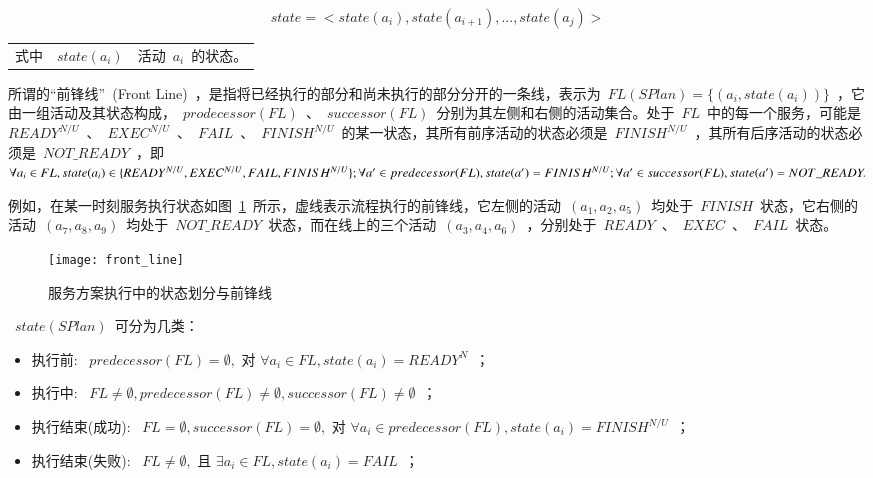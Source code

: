 \begin{equation}\label{equation:state_total}
state = < state(a_i),state(a_{i+1}),..., state(a_j)>
\end{equation}
\begin{tabularx}{\textwidth}{@{}l@{\quad}l@{\pozhehao }X@{}}
    式中
    & $state(a_i)$ & 活动~$a_i$~的状态。
\end{tabularx}\vspace{\wordsep}

所谓的“前锋线”~(Front Line)~，是指将已经执行的部分和尚未执行的部分分开的一条线，表示为~$FL(SPlan)=\{(a_i, state(a_i))\}$~，它由一组活动及其状态构成，~$prodecessor(FL)$~、~$successor(FL)$~分别为其左侧和右侧的活动集合。处于~$FL$~中的每一个服务，可能是~$READY^{N/U}$~、~$EXEC^{N/U}$~、~$FAIL$~、~$FINISH^{N/U}$~的某一状态，其所有前序活动的状态必须是~$FINISH^{N/U}$~，其所有后序活动的状态必须是~$NOT\_READY$~，即
$\forall {a_i} \in FL,state({a_i}) \in \{ READ{Y^{N/U}},{\rm{ }}EXE{C^{N/U}},{\rm{ }}FAIL,{\rm{ }}FINIS{H^{N/U}}\} ;\forall a' \in predecessor(FL),state(a') = FINIS{H^{N/U}};\forall a' \in successor(FL),state(a') = NOT\_READY.$

例如，在某一时刻服务执行状态如图~\ref{figure:front_line}~所示，虚线表示流程执行的前锋线，它左侧的活动~$(a_1, a_2, a_5)$~均处于~$FINISH$~状态，它右侧的活动~$(a_7, a_8, a_9)$~均处于~$NOT\_READY$~状态，而在线上的三个活动~$(a_3, a_4, a_6)$~，分别处于~$READY$~、~$EXEC$~、~$FAIL$~状态。

\begin{figure}[htbp]
    \centering
    \texttt{[image: front\_line]}
    \caption{服务方案执行中的状态划分与前锋线}\label{figure:front_line}
    \vspace{-1em}
\end{figure}

~$state(SPlan)$~可分为几类：
\begin{itemize}
\item 执行前: ~$predecessor(FL) = \emptyset ,$ 对 $ \forall {a_i} \in FL,state({a_i}) = READ{Y^N}$~；
\item 执行中: ~$FL \ne \emptyset ,predecessor(FL) \ne \emptyset ,successor(FL) \ne \emptyset $~；
\item 执行结束(成功): ~$FL = \emptyset ,successor(FL) = \emptyset ,$ 对 $\forall {a_i} \in predecessor(FL),state({a_i}) = FINIS{H^{N/U}}$~；
\item 执行结束(失败): ~$FL \ne \emptyset ,$ 且 $\exists {a_i} \in FL,state({a_i}) = FAIL$~；
\end{itemize}


